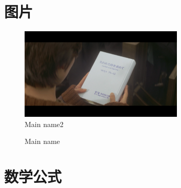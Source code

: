 \documentclass{ctexart}
\begin{document}
	\section{图片}
		\begin{figure}[H] %
			\centering%
			\includegraphics[width=0.7\textwidth]{1} %
			\caption{Main name2} %
			\label{Fig.main0} %
		\end{figure}
		\begin{figure}[H]
			\centering  %
			\caption{Main name}
			\label{Fig.main}
		\end{figure}

	\section{数学公式}


\end{document}
